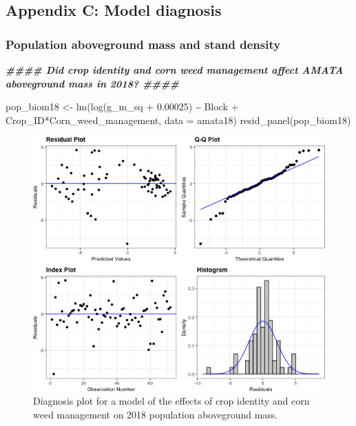 \documentclass[
]{article}
\author{}
\date{\vspace{-2.5em}}
\newenvironment{Shaded}{\begin{snugshade}}{\end{snugshade}}
\newcommand{\AttributeTok}[1]{\textcolor[rgb]{0.77,0.63,0.00}{#1}}
\newcommand{\DocumentationTok}[1]{\textcolor[rgb]{0.56,0.35,0.01}{\textbf{\textit{#1}}}}
\newcommand{\FloatTok}[1]{\textcolor[rgb]{0.00,0.00,0.81}{#1}}
\newcommand{\FunctionTok}[1]{\textcolor[rgb]{0.00,0.00,0.00}{#1}}
\newcommand{\NormalTok}[1]{#1}
\newcommand{\OtherTok}[1]{\textcolor[rgb]{0.56,0.35,0.01}{#1}}
\newcommand{\SpecialCharTok}[1]{\textcolor[rgb]{0.00,0.00,0.00}{#1}}
\begin{document}
\hypertarget{appendix-c-model-diagnosis}{%
\subsection*{Appendix C: Model diagnosis}\label{appendix-c-model-diagnosis}}

\hypertarget{population-aboveground-mass-and-stand-density}{%
\subsubsection*{Population aboveground mass and stand density}\label{population-aboveground-mass-and-stand-density}}

\begin{Shaded}
\begin{Highlighting}[]
\DocumentationTok{\#\#\#\# Did crop identity and corn weed management affect AMATA aboveground mass in 2018? \#\#\#\#}

\NormalTok{pop\_biom18 }\OtherTok{\textless{}{-}} \FunctionTok{lm}\NormalTok{(}\FunctionTok{log}\NormalTok{(g\_m\_sq }\SpecialCharTok{+} \FloatTok{0.00025}\NormalTok{) }\SpecialCharTok{\textasciitilde{}}\NormalTok{ Block }\SpecialCharTok{+}\NormalTok{ Crop\_ID}\SpecialCharTok{*}\NormalTok{Corn\_weed\_management, }
                   \AttributeTok{data =}\NormalTok{ amata18)}
\FunctionTok{resid\_panel}\NormalTok{(pop\_biom18) }
\end{Highlighting}
\end{Shaded}

\begin{figure}
\includegraphics[width=1\linewidth]{AppendixC_model_diagnosis_files/figure-latex/pop-biom-18-1} \caption{Diagnosis plot for a model of the effects of crop identity and corn weed management on 2018 population aboveground mass.}\label{fig:pop-biom-18}
\end{figure}
\end{document}
